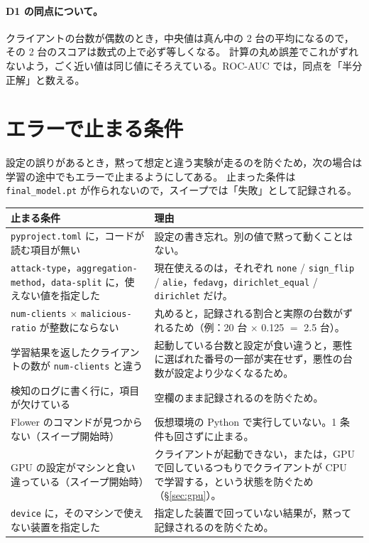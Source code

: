 \documentclass[a4j, dvipdfmx]{jsarticle}  %
\begin{document}
\paragraph{D1 の同点について。}
クライアントの台数が偶数のとき，中央値は真ん中の 2 台の平均になるので，その 2 台のスコアは数式の上で必ず等しくなる。
計算の丸め誤差でこれがずれないよう，ごく近い値は同じ値にそろえている。ROC-AUC では，同点を「半分正解」と数える。

\section{エラーで止まる条件}
\label{sec:guards}

設定の誤りがあるとき，黙って想定と違う実験が走るのを防ぐため，次の場合は学習の途中でもエラーで止まるようにしてある。
止まった条件は \texttt{final\_model.pt} が作られないので，スイープでは「失敗」として記録される。

\begin{table}[H]
\centering
\begin{tabular}{@{}P{6.4cm} P{8.9cm}@{}}
\toprule
止まる条件 & 理由 \\
\midrule
\texttt{pyproject.toml} に，コードが読む項目が無い & 設定の書き忘れ。別の値で黙って動くことはない。 \\
\texttt{attack-type}，\texttt{aggregation-method}，\texttt{data-split} に，使えない値を指定した &
現在使えるのは，それぞれ \texttt{none} / \texttt{sign\_flip} / \texttt{alie}，\texttt{fedavg}，\texttt{dirichlet\_equal} / \texttt{dirichlet} だけ。 \\
\texttt{num-clients} $\times$ \texttt{malicious-ratio} が整数にならない &
丸めると，記録される割合と実際の台数がずれるため（例：20 台 $\times$ 0.125 $=$ 2.5 台）。 \\
学習結果を返したクライアントの数が \texttt{num-clients} と違う &
起動している台数と設定が食い違うと，悪性に選ばれた番号の一部が実在せず，悪性の台数が設定より少なくなるため。 \\
検知のログに書く行に，項目が欠けている & 空欄のまま記録されるのを防ぐため。 \\
Flower のコマンドが見つからない（スイープ開始時） & 仮想環境の Python で実行していない。1 条件も回さずに止まる。 \\
GPU の設定がマシンと食い違っている（スイープ開始時） & クライアントが起動できない，または，GPU で回しているつもりでクライアントが CPU で学習する，という状態を防ぐため（\S\ref{sec:gpu}）。 \\
\texttt{device} に，そのマシンで使えない装置を指定した & 指定した装置で回っていない結果が，黙って記録されるのを防ぐため。 \\
\bottomrule
\end{tabular}
\end{table}
\end{document}
